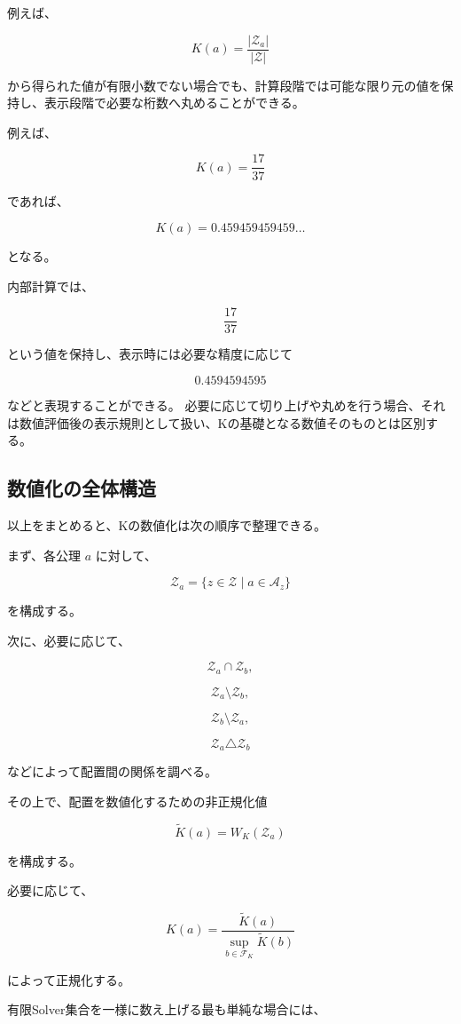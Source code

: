例えば、

\[
K(a)=\frac{|\mathcal{Z}_a|}{|\mathcal{Z}|}
\]

から得られた値が有限小数でない場合でも、計算段階では可能な限り元の値を保持し、表示段階で必要な桁数へ丸めることができる。

例えば、

\[
K(a)=\frac{17}{37}
\]

であれば、

\[
K(a) = 0.459459459459\ldots
\]

となる。

内部計算では、

\[
\frac{17}{37}
\]

という値を保持し、表示時には必要な精度に応じて

\[
0.4594594595
\]

などと表現することができる。
必要に応じて切り上げや丸めを行う場合、それは数値評価後の表示規則として扱い、Kの基礎となる数値そのものとは区別する。

\subsection{数値化の全体構造}

以上をまとめると、Kの数値化は次の順序で整理できる。

まず、各公理 $a$ に対して、

\[
\mathcal{Z}_a = \{z\in\mathcal{Z}\mid a\in\mathcal{A}_z\}
\]

を構成する。

次に、必要に応じて、

\[
\mathcal{Z}_a\cap\mathcal{Z}_b,
\]

\[
\mathcal{Z}_a\setminus\mathcal{Z}_b,
\]

\[
\mathcal{Z}_b\setminus\mathcal{Z}_a,
\]

\[
\mathcal{Z}_a\triangle\mathcal{Z}_b
\]

などによって配置間の関係を調べる。

その上で、配置を数値化するための非正規化値

\[
\widetilde{K}(a) = W_K(\mathcal{Z}_a)
\]

を構成する。

必要に応じて、

\[
K(a) = \frac{\widetilde{K}(a)}{\sup_{b\in\mathcal{F}_K}\widetilde{K}(b)}
\]

によって正規化する。

有限Solver集合を一様に数え上げる最も単純な場合には、

